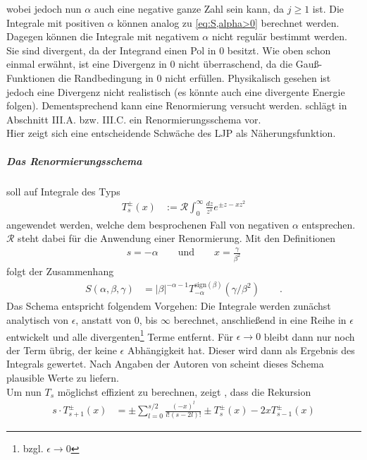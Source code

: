 wobei jedoch nun $\alpha$ auch eine negative ganze Zahl sein kann, da 
$j\geq1$ ist.  Die Integrale mit positiven $\alpha$ können analog zu 
\ref{eq:S,alpha>0} berechnet werden. Dagegen können die Integrale mit 
negativem $\alpha$ nicht regulär bestimmt werden. Sie sind divergent, da der 
Integrand einen Pol in 0 besitzt. Wie oben schon einmal erwähnt, ist eine 
Divergenz in 0 nicht überraschend, da die Gauß-Funktionen die Randbedingung in 
0 nicht erfüllen. Physikalisch gesehen ist jedoch eine Divergenz nicht 
realistisch (es könnte auch eine divergente Energie folgen). 
Dementsprechend kann eine Renormierung versucht werden. \cite{av:1a} schlägt in 
Abschnitt III.A. bzw. III.C. ein Renormierungsschema vor.\\
Hier zeigt sich eine entscheidende Schwäche des LJP als Näherungsfunktion. 
%
%
%
\subparagraph{Das Renormierungsschema} \label{sec:renorm}
%
soll auf Integrale des Typs 
%
\begin{align}\label{eq:def:T-Int}
T_s^\pm(x)&:=\mathcal{R}\int_{0}^{\infty}\frac{dz}{z^s}e^{\pm z-xz^2}
\end{align}
%
angewendet werden, welche dem besprochenen Fall von negativen 
$\alpha$ 
entsprechen. $\mathcal{R}$ steht dabei für die Anwendung einer 
Renormierung. 
Mit den Definitionen 
%
\begin{align}
s=-\alpha \qquad\text{und} \qquad x=\frac{\gamma}{\beta^2} 
\end{align} 
%
folgt der Zusammenhang 
%
\begin{align}\label{eq:SinT}
S(\alpha,\beta,\gamma)&=|\beta|^{-\alpha-1}T_{-\alpha}^{\text{sign} 
(\beta)}(\gamma/\beta^2) \qquad.
\end{align}
%
Das Schema entspricht folgendem Vorgehen: Die Integrale 
werden zunächst analytisch 
von $\epsilon$, anstatt von 0, bis $\infty$ berechnet, anschließend in eine 
Reihe in $\epsilon$ entwickelt und alle divergenten\footnote{bzgl. 
$\epsilon\rightarrow0$} Terme entfernt. Für $\epsilon\rightarrow0$ bleibt dann 
nur noch der Term übrig, der keine $\epsilon$ Abhängigkeit hat. Dieser wird 
dann als Ergebnis des Integrals gewertet. Nach Angaben der Autoren von 
\cite{av:1a} scheint dieses Schema plausible Werte zu liefern.\\
Um nun $T_s$ möglichst effizient zu berechnen, zeigt \cite{av:1a}, dass die 
Rekursion
%
\begin{align}\label{eq:recursivT}
s\cdot T^\pm_{s+1}(x)&=\pm\sum_{l=0}^{s/2}\frac{(-x)^l}{l!(s-2l)!}\pm 
T^\pm_{s}(x)-2xT^\pm_{s-1}(x)
\end{align}

